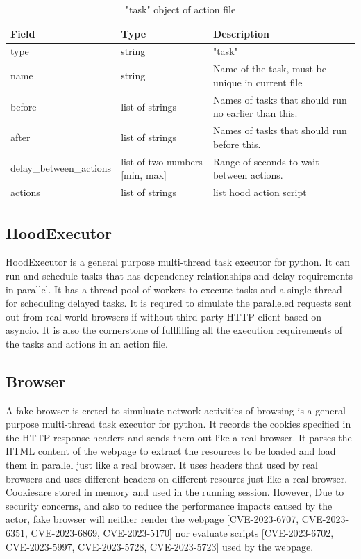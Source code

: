 \documentclass[mscthesis]{usiinfthesis}
\begin{document}
\begin{table}[H]
  \centering
  \begin{tabular}{|p{34mm}|p{26mm}|p{65mm}|}
    \hline
    Field                   & Type                           & Description                                          \\
    \hline
    type                    & string                         & "task"                                               \\
    name                    & string                         & Name of the task, must be unique in current file     \\
    before                  & list of strings                & Names of tasks that should run no earlier than this. \\
    after                   & list of strings                & Names of tasks that should run before this.          \\
    delay\_between\_actions & list of two numbers [min, max] & Range of seconds to wait between actions.            \\
    actions                 & list of strings                & list hood action script                              \\
    \hline
  \end{tabular}
  \caption{"task" object of action file}
  \label{tab:task_object}
\end{table}

\subsection{HoodExecutor}
HoodExecutor is a general purpose multi-thread task executor for python. It can run and schedule tasks that has dependency relationships and delay requirements in parallel. It has a thread pool of workers to execute tasks and a single thread for scheduling delayed tasks. It is requred to simulate the paralleled requests sent out from real world browsers if without third party HTTP client based on asyncio. It is also the cornerstone of fullfilling all the execution requirements of the tasks and actions in an action file.

\subsection{Browser}\label{sec:browser}
A fake browser is creted to simuluate network activities of browsing is a general purpose multi-thread task executor for python. It records the cookies specified in the HTTP response headers and sends them out like a real browser. It parses the HTML content of the webpage to extract the resources to be loaded and load them in parallel just like a real browser. It uses headers that used by real browsers and uses different headers on different resoures just like a real browser. Cookiesare stored in memory and used in the running session. However, Due to security concerns, and also to reduce the performance impacts caused by the actor, fake browser will neither render the webpage [CVE-2023-6707, CVE-2023-6351, CVE-2023-6869, CVE-2023-5170] nor evaluate scripts [CVE-2023-6702, CVE-2023-5997, CVE-2023-5728, CVE-2023-5723] used by the webpage.
\end{document}
